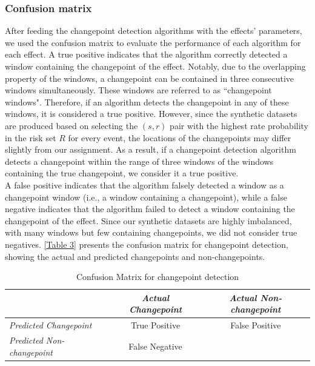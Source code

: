 \documentclass[]{interact}
\theoremstyle{plain}%
\theoremstyle{definition}
\theoremstyle{remark}
\begin{document}
	\subsubsection{Confusion matrix} \label{sec:confusion matrix}
	
	\hspace{0.28cm} After feeding the changepoint detection algorithms with the effects' parameters, we used the confusion matrix to evaluate the performance of each algorithm for each effect. A true positive indicates that the algorithm correctly detected a window containing the changepoint of the effect. Notably, due to the overlapping property of the windows, a changepoint can be contained in three consecutive windows simultaneously. These windows are referred to as ``changepoint windows". Therefore, if an algorithm detects the changepoint in any of these windows, it is considered a true positive. However, since the synthetic datasets are produced based on selecting the $(s,r)$ pair with the highest rate probability in the risk set $R$ for every event, the locations of the changepoints may differ slightly from our assignment. As a result, if a changepoint detection algorithm detects a changepoint within the range of three windows of the windows containing the true changepoint, we consider it a true positive. \\
	
	A false positive indicates that the algorithm falsely detected a window as a changepoint window (i.e., a window containing a changepoint), while a false negative indicates that the algorithm failed to detect a window containing the changepoint of the effect. Since our synthetic datasets are highly imbalanced, with many windows but few containing changepoints, we did not consider true negatives. \autoref{Table 3} presents the confusion matrix for changepoint detection, showing the actual and predicted changepoints and non-changepoints.
	
	\begin{table}[H]
	\centering
	\renewcommand{\arraystretch}{1.5} %
	\small
	\caption{Confusion Matrix for changepoint detection}
	\begin{tabular}{l|c|c}
		\hline
		& \textit{Actual Changepoint} & \textit{Actual Non-changepoint}                   \\ \hline
		\textit{Predicted Changepoint} & True Positive              & False Positive                               \\ \hline
		\textit{Predicted Non-changepoint} & False Negative             & \multicolumn{1}{l}{\cellcolor[HTML]{C0C0C0}} \\ \hline
	\end{tabular}
	\label{Table 3}
    \end{table}
	
\end{document}
